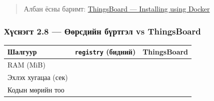 \begin{quote}
Албан ёсны баримт: \href{https://thingsboard.io/docs/installation/docker/}{ThingsBoard --- Installing using Docker}
\end{quote}

\hypertarget{ux445ux4afux441ux43dux44dux433ux442-2.8-ux4e9ux4e9ux440ux441ux434ux438ux439ux43d-ux431ux4afux440ux442ux433ux44dux43b-vs-thingsboard}{%
\subsubsection{Хүснэгт 2.8 --- Өөрсдийн бүртгэл vs ThingsBoard}\label{ux445ux4afux441ux43dux44dux433ux442-2.8-ux4e9ux4e9ux440ux441ux434ux438ux439ux43d-ux431ux4afux440ux442ux433ux44dux43b-vs-thingsboard}}

\begingroup\scriptsize\begin{longtable}[]{@{}lll@{}}
\toprule
\begin{minipage}[b]{0.30\columnwidth}\raggedright
Шалгуур\strut
\end{minipage} & \begin{minipage}[b]{0.30\columnwidth}\raggedright
\texttt{registry} (бидний)\strut
\end{minipage} & \begin{minipage}[b]{0.30\columnwidth}\raggedright
ThingsBoard\strut
\end{minipage}\tabularnewline
\midrule
\endhead
\begin{minipage}[t]{0.30\columnwidth}\raggedright
RAM (MiB)\strut
\end{minipage} & \begin{minipage}[t]{0.30\columnwidth}\raggedright
\strut
\end{minipage} & \begin{minipage}[t]{0.30\columnwidth}\raggedright
\strut
\end{minipage}\tabularnewline
\begin{minipage}[t]{0.30\columnwidth}\raggedright
Эхлэх хугацаа (сек)\strut
\end{minipage} & \begin{minipage}[t]{0.30\columnwidth}\raggedright
\strut
\end{minipage} & \begin{minipage}[t]{0.30\columnwidth}\raggedright
\strut
\end{minipage}\tabularnewline
\begin{minipage}[t]{0.30\columnwidth}\raggedright
Кодын мөрийн тоо\strut
\end{minipage} & \begin{minipage}[t]{0.30\columnwidth}\raggedright

\end{minipage}
\end{longtable}
